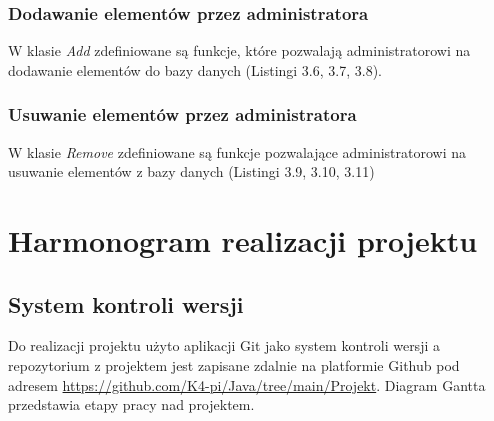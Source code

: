 \newpage


\subsection{Dodawanie elementów przez administratora}
W klasie \textit{Add} zdefiniowane są funkcje, które pozwalają administratorowi na dodawanie elementów do bazy danych (Listingi 3.6, 3.7, 3.8).

\newpage 


\newpage
\subsection{Usuwanie elementów przez administratora}
W klasie \textit{Remove} zdefiniowane są funkcje pozwalające administratorowi na usuwanie elementów z bazy danych (Listingi 3.9, 3.10, 3.11)


\newpage 



\chapter{Harmonogram realizacji projektu}
\section{System kontroli wersji}
Do realizacji projektu użyto aplikacji Git jako system kontroli wersji 
a repozytorium z projektem jest zapisane zdalnie na platformie Github pod adresem
\url{https://github.com/K4-pi/Java/tree/main/Projekt}.
Diagram Gantta przedstawia etapy pracy nad projektem.

